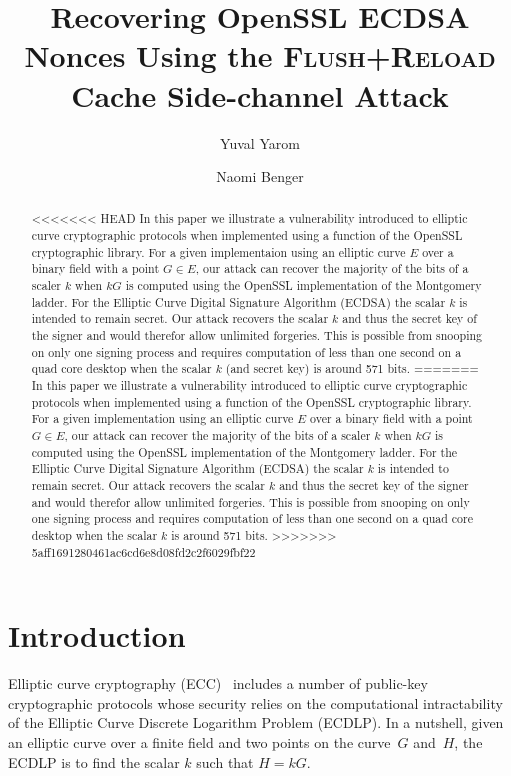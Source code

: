 \documentclass{llncs}
\begin{document}
\title{Recovering OpenSSL ECDSA Nonces Using the \textsc{Flush+Reload} Cache Side-channel Attack}
\author{Yuval Yarom \and Naomi Benger}

\maketitle

\begin{abstract}
<<<<<<< HEAD
In this paper we illustrate a vulnerability introduced to elliptic curve cryptographic protocols when implemented using a function of the OpenSSL cryptographic library. For a given implementaion using an elliptic curve $E$ over a binary field with a point $G\in E$, our attack can recover the majority of the bits of a scaler $k$ when $kG$ is computed using the OpenSSL implementation of the Montgomery ladder. For the Elliptic Curve Digital Signature Algorithm (ECDSA) the scalar $k$ is intended to remain secret. Our attack recovers the scalar $k$ and thus the secret key of the signer and would therefor allow unlimited forgeries. This is possible from snooping on only one signing process and requires computation of less than one second on a quad core desktop when the scalar $k$ (and secret key) is around 571 bits.
=======
In this paper we illustrate a vulnerability introduced to elliptic curve cryptographic protocols when implemented using a function of the OpenSSL cryptographic library. For a given implementation using an elliptic curve $E$ over a binary field with a point $G\in E$, our attack can recover the majority of the bits of a scaler $k$ when $kG$ is computed using the OpenSSL implementation of the Montgomery ladder. For the Elliptic Curve Digital Signature Algorithm (ECDSA) the scalar $k$ is intended to remain secret. Our attack recovers the scalar $k$ and thus the secret key of the signer and would therefor allow unlimited forgeries. This is possible from snooping on only one signing process and requires computation of less than one second on a quad core desktop when the scalar $k$ is around 571 bits.
>>>>>>> 5aff1691280461ac6cd6e8d08fd2c2f6029fbf22

\end{abstract}

\section{Introduction}
Elliptic curve cryptography (ECC)~\cite{miller85use,koblitz87elliptic} includes a number of public-key cryptographic protocols whose security relies on the computational intractability of the Elliptic Curve Discrete Logarithm Problem (ECDLP).
In a nutshell, given an elliptic curve over a finite field and two points on the curve~$G$ and~$H$, the ECDLP is to find the scalar $k$ such that $H=kG$.
\end{document}
